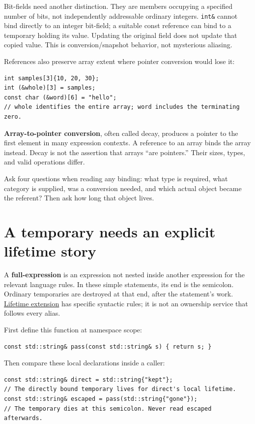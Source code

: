 Bit-fields need another distinction. They are members occupying a specified number of bits, not independently addressable ordinary integers. \texttt{int\&} cannot bind directly to an integer bit-field; a suitable const reference can bind to a temporary holding its value. Updating the original field does not update that copied value. This is conversion/snapshot behavior, not mysterious aliasing.

References also preserve array extent where pointer conversion would lose it:

\begin{verbatim}
int samples[3]{10, 20, 30};
int (&whole)[3] = samples;
const char (&word)[6] = "hello";
// whole identifies the entire array; word includes the terminating zero.
\end{verbatim}

\textbf{Array-to-pointer conversion}, often called decay, produces a pointer to the first element in many expression contexts. A reference to an array binds the array instead. Decay is not the assertion that arrays ``are pointers.'' Their sizes, types, and valid operations differ.

Ask four questions when reading any binding: what type is required, what category is supplied, was a conversion needed, and which actual object became the referent? Then ask how long that object lives.

\section{A temporary needs an explicit lifetime story}\label{05-engine-i-ch003-a-temporary-needs-an-explicit-lifetime-story}

A \textbf{full-expression} is an expression not nested inside another expression for the relevant language rules. In these simple statements, its end is the semicolon. Ordinary temporaries are destroyed at that end, after the statement's work. \hyperref[appendix-a978b29bbbb0]{Lifetime extension} has specific syntactic rules; it is not an ownership service that follows every alias.

First define this function at namespace scope:

\begin{verbatim}
const std::string& pass(const std::string& s) { return s; }
\end{verbatim}

Then compare these local declarations inside a caller:

\begin{verbatim}
const std::string& direct = std::string{"kept"};
// The directly bound temporary lives for direct's local lifetime.
const std::string& escaped = pass(std::string{"gone"});
// The temporary dies at this semicolon. Never read escaped afterwards.
\end{verbatim}

